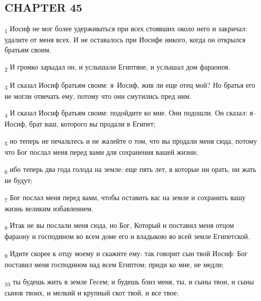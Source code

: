 \subsection{CHAPTER 45}
\begin{tcolorbox}
\textsubscript{1} Иосиф не мог более удерживаться при всех стоявших около него и закричал: удалите от меня всех. И не оставалось при Иосифе никого, когда он открылся братьям своим.
\end{tcolorbox}
\begin{tcolorbox}
\textsubscript{2} И громко зарыдал он, и услышали Египтяне, и услышал дом фараонов.
\end{tcolorbox}
\begin{tcolorbox}
\textsubscript{3} И сказал Иосиф братьям своим: я--Иосиф, жив ли еще отец мой? Но братья его не могли отвечать ему, потому что они смутились пред ним.
\end{tcolorbox}
\begin{tcolorbox}
\textsubscript{4} И сказал Иосиф братьям своим: подойдите ко мне. Они подошли. Он сказал: я--Иосиф, брат ваш, которого вы продали в Египет;
\end{tcolorbox}
\begin{tcolorbox}
\textsubscript{5} но теперь не печальтесь и не жалейте о том, что вы продали меня сюда, потому что Бог послал меня перед вами для сохранения вашей жизни;
\end{tcolorbox}
\begin{tcolorbox}
\textsubscript{6} ибо теперь два года голода на земле: еще пять лет, в которые ни орать, ни жать не будут;
\end{tcolorbox}
\begin{tcolorbox}
\textsubscript{7} Бог послал меня перед вами, чтобы оставить вас на земле и сохранить вашу жизнь великим избавлением.
\end{tcolorbox}
\begin{tcolorbox}
\textsubscript{8} Итак не вы послали меня сюда, но Бог, Который и поставил меня отцом фараону и господином во всем доме его и владыкою во всей земле Египетской.
\end{tcolorbox}
\begin{tcolorbox}
\textsubscript{9} Идите скорее к отцу моему и скажите ему: так говорит сын твой Иосиф: Бог поставил меня господином над всем Египтом; приди ко мне, не медли;
\end{tcolorbox}
\begin{tcolorbox}
\textsubscript{10} ты будешь жить в земле Гесем; и будешь близ меня, ты, и сыны твои, и сыны сынов твоих, и мелкий и крупный скот твой, и все твое;
\end{tcolorbox}
